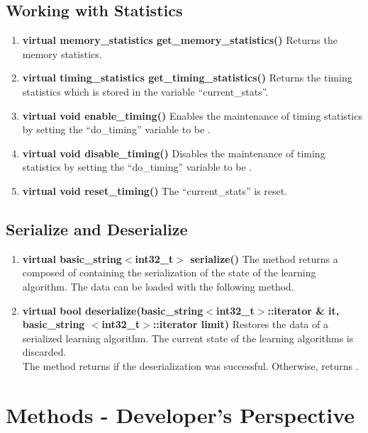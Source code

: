 \subsection*{Working with Statistics}

\begin{enumerate}
 \item \textbf{virtual memory\_statistics get\_memory\_statistics()} \vskip 1pt
	Returns the memory statistics.

 \item \textbf{virtual timing\_statistics get\_timing\_statistics()} \vskip 1pt
	Returns the timing statistics which is stored in the variable ``current\_stats''.

 \item \textbf{virtual void enable\_timing()} \vskip 1pt
	Enables the maintenance of timing statistics by setting the ``do\_timing'' variable to be \true.

 \item \textbf{virtual void disable\_timing()} \vskip 1pt
	Disables the maintenance of timing statistics by setting the ``do\_timing'' variable to be \false.

 \item \textbf{virtual void reset\_timing()} \vskip 1pt
	The ``current\_stats'' is reset.
\end{enumerate}

\subsection*{Serialize and Deserialize}

\begin{enumerate}
 \item \textbf{virtual basic\_string$<$int32\_t$>$ serialize()} \vskip 1pt
	The method returns a \stringtype composed of \integer containing the serialization of the state of the learning algorithm. The data can be loaded with the following method.

 \item \textbf{virtual bool deserialize(basic\_string$<$int32\_t$>$::iterator \& it, basic\_string $<$int32\_t$>$::iterator limit)} \vskip 1pt
	Restores the data of a serialized learning algorithm. The current state of the learning algorithms is discarded. \\
	The method returns \true if the deserialization was successful. Otherwise, returns \false.
\end{enumerate}


\section{Methods - Developer's Perspective}

